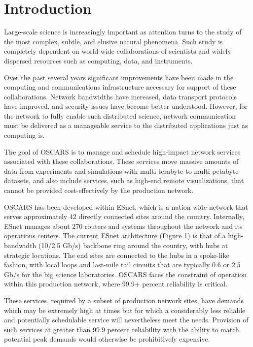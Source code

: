 \documentclass[conference]{IEEEtran}
\begin{document}
\section{Introduction}
Large-scale science is increasingly important as attention turns to the
study of the most complex, subtle, and elusive natural phenomena.  Such
study is completely dependent on world-wide collaborations of scientists
and widely dispersed resources such as computing, data, and instruments.

Over the past several years significant improvements have been made in the
computing and communications infrastructure necessary for support of these
collaborations.  Network bandwidths have increased, data transport protocols
have improved, and security issues have become better understood.  However,
for the network to fully enable such distributed science, network
communication must be delivered as a manageable service to the distributed
applications just as computing is.

The goal of OSCARS is to manage and schedule high-impact network services
associated with these collaborations.  These services
move massive amounts of data from experiments and 
simulations with multi-terabyte to multi-petabyte datasets, and also include
services, such as high-end remote visualizations,
that cannot be provided cost-effectively by the production network.

OSCARS has been developed within ESnet,
which is a nation wide network that serves approximately 42 directly connected 
sites around the country.  Internally, ESnet manages about 270 routers and 
systems throughout the network and its operations centers.  The current ESnet 
architecture (Figure 1) is that of a high-bandwidth (10/2.5 Gb/s) backbone ring 
around the country, with hubs at strategic locations.  The end sites are 
connected to the hubs in a spoke-like fashion, with local loops and last-mile 
tail circuits that are typically 0.6 or 2.5 Gb/s for the big science 
laboratories.  OSCARS faces the constraint of operation within this production 
network, where 99.9+ percent reliability is critical.

These services, required by a subset of production network sites, have demands 
which may be extremely high at times but for which a considerably less reliable 
and potentially schedulable service will nevertheless meet the needs.  Provision
of such services at greater than 99.9 percent reliability with the ability to 
match potential peak demands would otherwise be prohibitively expensive.
\end{document}
